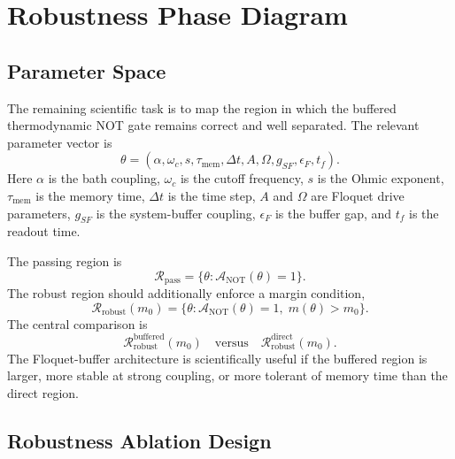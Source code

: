 \documentclass[11pt]{article}
\begin{document}
\clearpage
\section{Robustness Phase Diagram}

\subsection{Parameter Space}

The remaining scientific task is to map the region in which the buffered thermodynamic NOT
gate remains correct and well separated.  The relevant parameter vector is
\begin{equation}
    \theta
    =
    \left(
        \alpha,
        \omega_c,
        s,
        \tau_{\mathrm{mem}},
        \Delta t,
        A,
        \Omega,
        g_{SF},
        \epsilon_F,
        t_f
    \right).
\end{equation}
Here $\alpha$ is the bath coupling, $\omega_c$ is the cutoff frequency, $s$ is the Ohmic
exponent, $\tau_{\mathrm{mem}}$ is the memory time, $\Delta t$ is the time step, $A$ and
$\Omega$ are Floquet drive parameters, $g_{SF}$ is the system-buffer coupling, $\epsilon_F$
is the buffer gap, and $t_f$ is the readout time.

The passing region is
\begin{equation}
    \mathcal{R}_{\mathrm{pass}}
    =
    \{\theta:\mathcal{A}_{\mathrm{NOT}}(\theta)=1\}.
\end{equation}
The robust region should additionally enforce a margin condition,
\begin{equation}
    \mathcal{R}_{\mathrm{robust}}(m_0)
    =
    \{\theta:\mathcal{A}_{\mathrm{NOT}}(\theta)=1,\;m(\theta)>m_0\}.
\end{equation}
The central comparison is
\begin{equation}
    \mathcal{R}_{\mathrm{robust}}^{\mathrm{buffered}}(m_0)
    \quad\mathrm{versus}\quad
    \mathcal{R}_{\mathrm{robust}}^{\mathrm{direct}}(m_0).
\end{equation}
The Floquet-buffer architecture is scientifically useful if the buffered region is larger,
more stable at strong coupling, or more tolerant of memory time than the direct region.

\subsection{Robustness Ablation Design}
\end{document}
